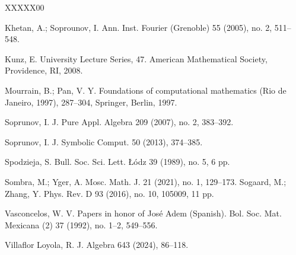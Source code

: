 \documentclass[a4paper,11pt]{amsart}
\numberwithin{thm}{section}
\numberwithin{equation}{section}
\theoremstyle{definition}
\theoremstyle{plain}
\begin{document}
\begin{thebibliography}{XXXXX00}

Khetan, A.; Soprounov, I.
\newblock Ann. Inst. Fourier (Grenoble) 55 (2005), no. 2, 511--548. 

Kunz, E.
\newblock University Lecture Series, 47. American Mathematical Society, Providence, RI, 2008.

Mourrain, B.; Pan, V. Y. 
\newblock  Foundations of computational mathematics (Rio de Janeiro, 1997), 287--304, Springer, Berlin, 1997. 

Soprunov, I.
\newblock J. Pure Appl. Algebra 209 (2007), no. 2, 383--392. 

Soprunov, I.
\newblock J. Symbolic Comput. 50 (2013), 374--385.


Spodzieja, S.
\newblock Bull. Soc. Sci. Lett. {\L}\'odz 39 (1989), no. 5, 6 pp.

Sombra, M.; Yger, A.
\newblock Mosc. Math. J. 21 (2021), no. 1, 129--173. 
Sogaard, M.; Zhang, Y.
\newblock Phys. Rev. D 93 (2016), no. 10, 105009, 11 pp. 

Vasconcelos, W. V. 
 Papers in honor of Jos\'e Adem (Spanish). 
\newblock Bol. Soc. Mat. Mexicana (2) 37 (1992), no. 1--2, 549--556. 

Villaflor Loyola, R.
\newblock J. Algebra 643 (2024), 86--118.


\end{thebibliography}
\end{document}

